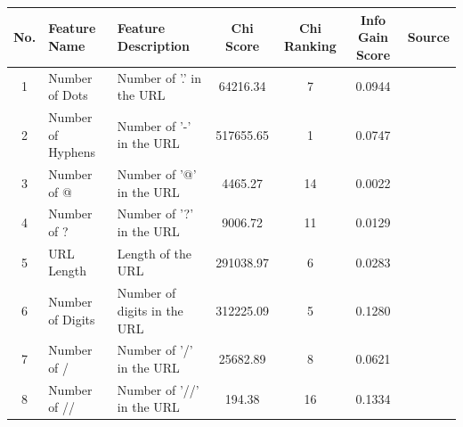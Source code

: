 \documentclass{article}
\begin{document}
    \begin{table}[H]
        \begin{adjustwidth}{-3cm}{}
            \centering
            \begin{tabular}{|c|p{4cm}|p{5cm}|c|c|c|c|}
                \hline
                \textbf{No.} & \textbf{Feature Name}           & \textbf{Feature Description}                   & \textbf{Chi Score} & \textbf{Chi Ranking} & \textbf{Info Gain Score} & \textbf{Source} \\ \hline
                1            & Number of Dots                  & Number of '.' in the URL                       & 64216.34           & 7                    & 0.0944                   & \cite{LexicalFeatureSelection}                  \\ \hline
                2            & Number of Hyphens               & Number of '-' in the URL                       & 517655.65          & 1                    & 0.0747                   & \cite{PhishSafe} \cite{LexicalFeatureSelection} \\ \hline
                3            & Number of @                     & Number of '@' in the URL                       & 4465.27            & 14                   & 0.0022                   & \cite{PhishSafe} \cite{LexicalFeatureSelection} \\ \hline
                4            & Number of ?                     & Number of '?' in the URL                       & 9006.72            & 11                   & 0.0129                   & \cite{LexicalFeatureSelection}                  \\ \hline
                5            & URL Length                      & Length of the URL                              & 291038.97          & 6                    & 0.0283                   & \cite{PhishSafe} \cite{LexicalFeatureSelection} \\ \hline
                6            & Number of Digits                & Number of digits in the URL                    & 312225.09          & 5                    & 0.1280                   & \cite{PhishingLoginURLDetection}                \\ \hline
                7            & Number of /                     & Number of '/' in the URL                       & 25682.89           & 8                    & 0.0621                   & \cite{LexicalFeatureSelection}                  \\ \hline
                8            & Number of //                    & Number of '//' in the URL                      & 194.38             & 16                   & 0.1334                   & \cite{PhishSafe} \cite{LexicalFeatureSelection} \\ \hline

\end{tabular}
\end{adjustwidth}
\end{table}
\end{document}
